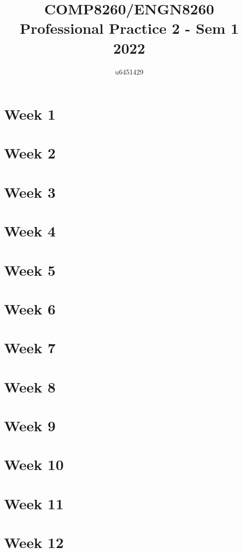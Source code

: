 \documentclass{article}
\title{COMP8260/ENGN8260 \\ Professional Practice 2 - Sem 1 2022}
\author{u6451429}
\begin{document}
  
\maketitle
  
\tableofcontents

\pagebreak
\section{Week 1}

\pagebreak
\section{Week 2}

\pagebreak
\section{Week 3}

\pagebreak
\section{Week 4}

\pagebreak
\section{Week 5}

\pagebreak
\section{Week 6}

\pagebreak
\section{Week 7}

\pagebreak
\section{Week 8}

\pagebreak
\section{Week 9}

\pagebreak
\section{Week 10}

\pagebreak
\section{Week 11}

\pagebreak
\section{Week 12}
\end{document}
